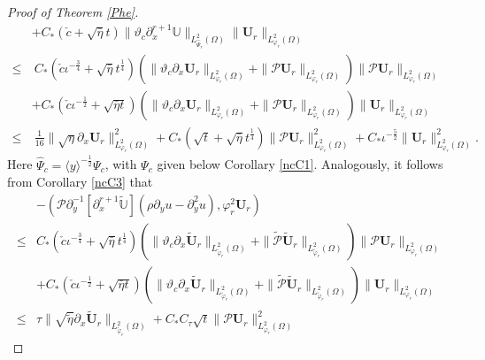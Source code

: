 \documentclass[10pt,a4paper]{amsart}
\newcommand\y{{{\langle y \rangle}}}
\begin{document}
\begin{proof}[Proof of Theorem \ref{Phe}]
\begin{align}
    &+C_{*}(\check{c}+\sqrt{\bar{\eta}}t)\|\vartheta_{c}\partial_{x}^{r+1}\mathbb{U}\|_{L_{\hat{\Psi}_{r}}^{2}(\Omega)}
          \|\mathbf{U}_{r}\|_{L_{\varphi_{r}}^{2}(\Omega)}\nonumber\\
\leq&~C_{*}(\check{c}\iota^{-\frac{3}{4}}+\sqrt{\bar{\eta}}t^{\frac{1}{4}})
      \left(\|\vartheta_{c}\partial_{x}\mathbf{U}_{r}\|_{L_{\varphi_{r}}^{2}(\Omega)}
            +\|\mathcal{P}\mathbf{U}_{r}\|_{L_{\varphi_{r}}^{2}(\Omega)}\right)
      \|\mathcal{P}\mathbf{U}_{r}\|_{L_{\varphi_{r}}^{2}(\Omega)}\nonumber\\
    &+C_{*}(\check{c}\iota^{-\frac{1}{2}}+\sqrt{\bar{\eta}t})
      \left(\|\vartheta_{c}\partial_{x}\mathbf{U}_{r}\|_{L_{\varphi_{r}}^{2}(\Omega)}
            +\|\mathcal{P}\mathbf{U}_{r}\|_{L_{\varphi_{r}}^{2}(\Omega)}\right)
      \|\mathbf{U}_{r}\|_{L_{\varphi_{r}}^{2}(\Omega)}\nonumber\\
\leq&~\frac{1}{16}\|\sqrt{\eta}\partial_{x}\mathbf{U}_{r}\|_{L_{\varphi_{r}}^{2}(\Omega)}^{2}
     +C_{*}(\sqrt{t}+\sqrt{\bar{\eta}}t^{\frac{1}{4}})\|\mathcal{P}\mathbf{U}_{r}\|_{L_{\varphi_{r}}^{2}(\Omega)}^{2}
     +C_{*}\iota^{-\frac{5}{2}}\|\mathbf{U}_{r}\|_{L_{\varphi_{r}}^{2}(\Omega)}^{2}.\nonumber
\end{align}
Here $\hat{\Psi}_{c}=\y^{-\frac{1}{2}}\Psi_{c}$, with $\Psi_{c}$ given below Corollary \ref{ncC1}. Analogously, it follows from Corollary \ref{ncC3} that
\begin{align}\label{JJ122}
&-(\mathcal{P}\partial_{y}^{-1}[\partial_{x}^{r+1}\tilde{\mathbb{U}}](\rho\partial_{y}u-\partial_{y}^{2}u),\varphi_{r}^{2}\mathbf{U}_{r})\\
\leq& C_{*}(\check{c}\iota^{-\frac{3}{4}}+\sqrt{\bar{\eta}}t^{\frac{1}{4}})
      \left(\|\vartheta_{c}\partial_{x}\tilde{\mathbf{U}}_{r}\|_{L_{\tilde{\varphi}_{r}}^{2}(\Omega)}
            +\|\tilde{\mathcal{P}}\tilde{\mathbf{U}}_{r}\|_{L_{\tilde{\varphi}_{r}}^{2}(\Omega)}\right)
      \|\mathcal{P}\mathbf{U}_{r}\|_{L_{\varphi_{r}}^{2}(\Omega)}\nonumber\\
    &+C_{*}(\check{c}\iota^{-\frac{1}{2}}+\sqrt{\bar{\eta}t})
      \left(\|\vartheta_{c}\partial_{x}\tilde{\mathbf{U}}_{r}\|_{L_{\tilde{\varphi}_{r}}^{2}(\Omega)}
            +\|\tilde{\mathcal{P}}\tilde{\mathbf{U}}_{r}\|_{L_{\tilde{\varphi}_{r}}^{2}(\Omega)}\right)
      \|\mathbf{U}_{r}\|_{L_{\varphi_{r}}^{2}(\Omega)}\nonumber\\
\leq& \tau\|\sqrt{\tilde{\eta}}\partial_{x}\tilde{\mathbf{U}}_{r}\|_{L_{\tilde{\varphi}_{r}}^{2}(\Omega)}
     +C_{*}C_{\tau}\sqrt{t}\|\mathcal{P}\mathbf{U}_{r}\|_{L_{\varphi_{r}}^{2}(\Omega)}^{2}

\end{align}
\end{proof}
\end{document}
